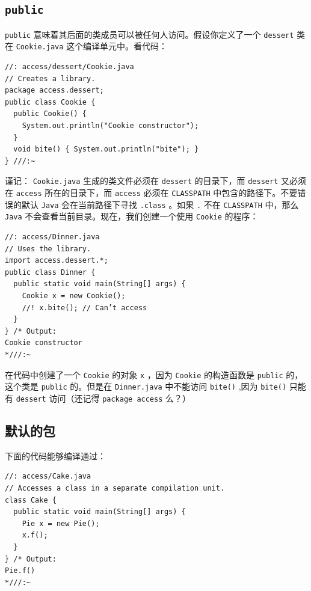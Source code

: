 \documentclass[10pt,a4paper,UTF8]{article}
\begin{document}
\subsection{\texttt{public}}
\label{sec:org4101295}


\texttt{public} 意味着其后面的类成员可以被任何人访问。假设你定义了一个 \texttt{dessert} 类在 \texttt{Cookie.java} 这个编译单元中。看代码：
\lstset{language=C,label= ,caption= ,captionpos=b,numbers=none}
\begin{lstlisting}
//: access/dessert/Cookie.java
// Creates a library.
package access.dessert;
public class Cookie {
  public Cookie() {
    System.out.println("Cookie constructor");
  }
  void bite() { System.out.println("bite"); }
} ///:~
\end{lstlisting}
谨记： \texttt{Cookie.java} 生成的类文件必须在 \texttt{dessert} 的目录下，而 \texttt{dessert} 又必须在 \texttt{access} 所在的目录下，而 \texttt{access} 必须在 \texttt{CLASSPATH} 中包含的路径下。不要错误的默认 \texttt{Java} 会在当前路径下寻找 \texttt{.class} 。如果 \texttt{.} 不在 \texttt{CLASSPATH} 中，那么 \texttt{Java} 不会查看当前目录。现在，我们创建一个使用 \texttt{Cookie} 的程序：
\lstset{language=C,label= ,caption= ,captionpos=b,numbers=none}
\begin{lstlisting}
//: access/Dinner.java
// Uses the library.
import access.dessert.*;
public class Dinner {
  public static void main(String[] args) {
    Cookie x = new Cookie();
    //! x.bite(); // Can’t access
  }
} /* Output:
Cookie constructor
*///:~
\end{lstlisting}

在代码中创建了一个 \texttt{Cookie} 的对象 \texttt{x} ，因为 \texttt{Cookie} 的构造函数是 \texttt{public} 的，这个类是 \texttt{public} 的。但是在 \texttt{Dinner.java} 中不能访问 \texttt{bite()} ,因为 \texttt{bite()} 只能有 \texttt{dessert} 访问（还记得 \texttt{package access} 么？）
\subsection{默认的包}
\label{sec:org6a5f6b8}


下面的代码能够编译通过：
\lstset{language=C,label= ,caption= ,captionpos=b,numbers=none}
\begin{lstlisting}
//: access/Cake.java
// Accesses a class in a separate compilation unit.
class Cake {
  public static void main(String[] args) {
    Pie x = new Pie();
    x.f();
  }
} /* Output:
Pie.f()
*///:~
\end{lstlisting}
\end{document}

